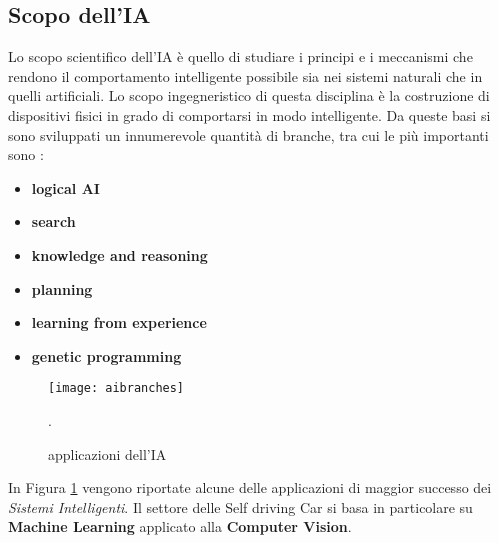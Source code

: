 \subsection{Scopo dell'IA}
Lo scopo scientifico  dell'IA è quello di studiare i principi e i meccanismi che rendono il comportamento intelligente possibile sia
nei sistemi naturali che in quelli artificiali. Lo scopo ingegneristico di questa disciplina è la costruzione di dispositivi fisici
in grado di comportarsi in modo intelligente. Da queste basi si sono sviluppati un innumerevole quantità di branche, tra cui le più importanti sono \cite{ai}:
\begin{itemize}
  \item \textbf{logical AI}
  \item \textbf{search}
  \item \textbf{knowledge and reasoning}
  \item \textbf{planning}
  \item \textbf{learning from experience}
  \item \textbf{genetic programming}
\end{itemize}
\begin{figure}
  \texttt{[image: aibranches]}
  \caption{applicazioni dell'IA \cite{branch}}.
  \label{fig:branches}
\end{figure}
In Figura \ref{fig:branches} vengono riportate alcune delle applicazioni di maggior successo dei \emph{Sistemi Intelligenti}.
Il settore delle Self driving Car si basa in particolare su \textbf{Machine Learning} applicato alla \textbf{Computer Vision}.

